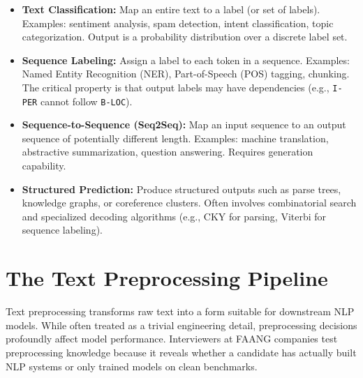 \begin{itemize}
    \item \textbf{Text Classification:} Map an entire text to a label (or set of labels).
    Examples: sentiment analysis, spam detection, intent classification, topic
    categorization. Output is a probability distribution over a discrete label set.

    \item \textbf{Sequence Labeling:} Assign a label to each token in a sequence. Examples:
    Named Entity Recognition (NER), Part-of-Speech (POS) tagging, chunking. The
    critical property is that output labels may have dependencies (e.g., \texttt{I-PER}
    cannot follow \texttt{B-LOC}).

    \item \textbf{Sequence-to-Sequence (Seq2Seq):} Map an input sequence to an output
    sequence of potentially different length. Examples: machine translation,
    abstractive summarization, question answering. Requires generation capability.

    \item \textbf{Structured Prediction:} Produce structured outputs such as parse trees,
    knowledge graphs, or coreference clusters. Often involves combinatorial search and
    specialized decoding algorithms (e.g., CKY for parsing, Viterbi for sequence
    labeling).
\end{itemize}

\section{The Text Preprocessing Pipeline}
\label{sec:preprocessing}

Text preprocessing transforms raw text into a form suitable for downstream NLP models.
While often treated as a trivial engineering detail, preprocessing decisions profoundly
affect model performance. Interviewers at FAANG companies test preprocessing knowledge
because it reveals whether a candidate has actually built NLP systems or only trained models
on clean benchmarks.

